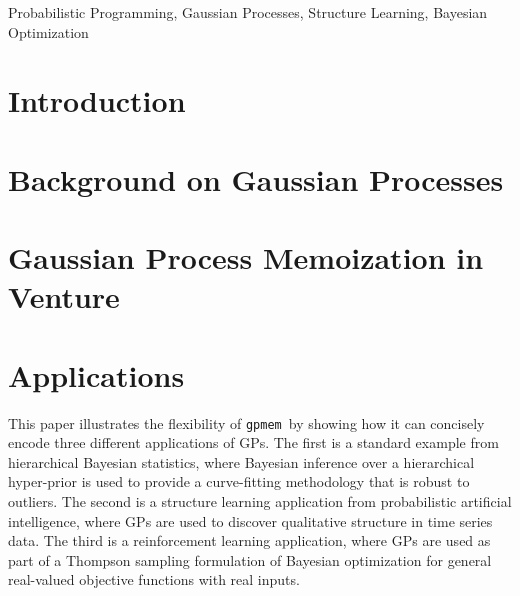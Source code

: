 \documentclass[twoside,11pt]{article}
\newcommand{\gpmem}{\texttt{gpmem}}
\newcommand{\myparagraph}[1]{\paragraph{#1}\mbox{}\\}
\begin{document}
\begin{keywords}
  Probabilistic Programming, Gaussian Processes, Structure Learning, Bayesian Optimization
\end{keywords}


\section{Introduction}

%
%

%

\section{Background on Gaussian Processes}


%

\section{Gaussian Process Memoization in Venture}


\section{Applications}
This paper illustrates the flexibility of \gpmem\ by showing how it can concisely encode three different applications of \ac{GP}s.
The first is a standard example from hierarchical Bayesian statistics, where Bayesian inference over a hierarchical hyper-prior is used to provide a curve-fitting methodology that is robust to outliers.
The second is a structure learning application from probabilistic artificial intelligence, where \ac{GP}s are used to discover qualitative structure in time series data.
The third is a reinforcement learning application, where \ac{GP}s are used as part of a Thompson sampling formulation of Bayesian optimization for general real-valued objective functions with real inputs.
\end{document}
